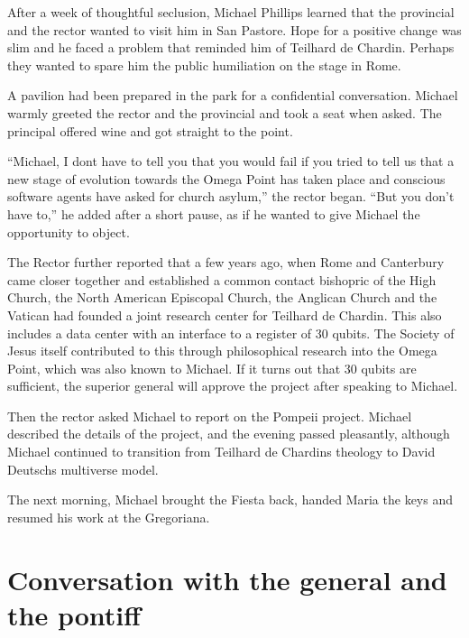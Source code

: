 \documentclass[
]{article}
\begin{document}
After a week of thoughtful seclusion, Michael Phillips learned that the
provincial and the rector wanted to visit him in San Pastore. Hope for a
positive change was slim and he faced a problem that reminded him of
Teilhard de Chardin. Perhaps they wanted to spare him the public
humiliation on the stage in Rome.

A pavilion had been prepared in the park for a confidential
conversation. Michael warmly greeted the rector and the provincial and
took a seat when asked. The principal offered wine and got straight to
the point.

``Michael, I don\textquotesingle t have to tell you that you would fail
if you tried to tell us that a new stage of evolution towards the Omega
Point has taken place and conscious software agents have asked for
church asylum,'' the rector began. ``But you don't have to,'' he added
after a short pause, as if he wanted to give Michael the opportunity to
object.

The Rector further reported that a few years ago, when Rome and
Canterbury came closer together and established a common contact
bishopric of the High Church, the North American Episcopal Church, the
Anglican Church and the Vatican had founded a joint research center for
Teilhard de Chardin. This also includes a data center with an interface
to a register of 30 qubits. The Society of Jesus itself contributed to
this through philosophical research into the Omega Point, which was also
known to Michael. If it turns out that 30 qubits are sufficient, the
superior general will approve the project after speaking to Michael.

Then the rector asked Michael to report on the Pompeii project. Michael
described the details of the project, and the evening passed pleasantly,
although Michael continued to transition from Teilhard de
Chardin\textquotesingle s theology to David Deutsch\textquotesingle s
multiverse model.

The next morning, Michael brought the Fiesta back, handed Maria the keys
and resumed his work at the Gregoriana.

\section{Conversation with the general and the
pontiff}\label{conversation-with-the-general-and-the-pontiff}
\end{document}
